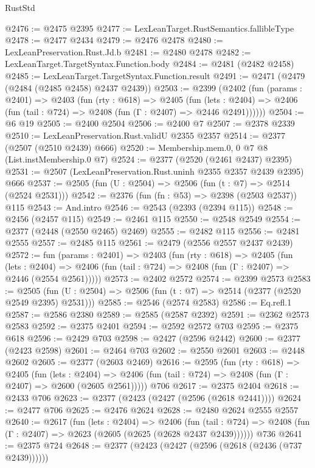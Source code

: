\begin{lexlean}{RustStd}
\begin{coremodule}
@2476 := @2475 @2395
@2477 := LexLeanTarget.RustSemantics.fallibleType
@2478 := @2477 @2434
@2479 := @2476 @2478
@2480 := LexLeanPreservation.Rust.Jd.b
@2481 := @2480 @2478
@2482 := LexLeanTarget.TargetSyntax.Function.body
@2484 := @2481 (@2482 @2458)
@2485 := LexLeanTarget.TargetSyntax.Function.result
@2491 := @2471 (@2479 (@2484 (@2485 @2458) @2437 @2439))
@2503 := @2399
    (@2402
      (fun (params : @2401) =>
      @2403
        (fun (rty : @618) =>
        @2405
          (fun (lets : @2404) =>
          @2406 (fun (tail : @724) => @2408 (fun (Γ : @2407) => @2446 @2491))))))
@2504 := @6 @19
@2505 := @2400 @2504
@2506 := @2400 @7
@2507 := @2378 @2339
@2510 := LexLeanPreservation.Rust.validU @2355 @2357
@2514 := @2377 (@2507 (@2510 @2439) @666)
@2520 := Membership.mem.{0, 0} @7 @8 (List.instMembership.{0} @7)
@2524 := @2377 (@2520 (@2461 @2437) @2395)
@2531 := @2507 (LexLeanPreservation.Rust.uninh @2355 @2357 @2439 @2395) @666
@2537 := @2505 (fun (U : @2504) => @2506 (fun (t : @7) => @2514 (@2524 @2531)))
@2542 := @2376 (fun (fn : @53) => @2398 (@2503 @2537)) @115
@2543 := And.intro
@2546 := @2543 (@2393 (@2394 @115))
@2548 := @2456 (@2457 @115)
@2549 := @2461 @115
@2550 := @2548 @2549
@2554 := @2377 (@2448 (@2550 @2465) @2469)
@2555 := @2482 @115
@2556 := @2481 @2555
@2557 := @2485 @115
@2561 := @2479 (@2556 @2557 @2437 @2439)
@2572 := fun (params : @2401) =>
  @2403
    (fun (rty : @618) =>
    @2405
      (fun (lets : @2404) =>
      @2406 (fun (tail : @724) => @2408 (fun (Γ : @2407) => @2446 (@2554 @2561)))))
@2573 := @2402 @2572
@2574 := @2399 @2573
@2583 := @2505 (fun (U : @2504) => @2506 (fun (t : @7) => @2514 (@2377 (@2520 @2549 @2395) @2531)))
@2585 := @2546 (@2574 @2583)
@2586 := Eq.refl.{1}
@2587 := @2586 @2380
@2589 := @2585 (@2587 @2392)
@2591 := @2362 @2573 @2583
@2592 := @2375 @2401
@2594 := @2592 @2572 @703
@2595 := @2375 @618
@2596 := @2429 @703
@2598 := @2427 (@2596 @2442)
@2600 := @2377 (@2423 @2598)
@2601 := @2464 @703
@2602 := @2550 @2601
@2603 := @2448 @2602
@2605 := @2377 (@2603 @2469)
@2616 := @2595
    (fun (rty : @618) =>
    @2405
      (fun (lets : @2404) =>
      @2406 (fun (tail : @724) => @2408 (fun (Γ : @2407) => @2600 (@2605 @2561)))))
    @706
@2617 := @2375 @2404
@2618 := @2433 @706
@2623 := @2377 (@2423 (@2427 (@2596 (@2618 @2441))))
@2624 := @2477 @706
@2625 := @2476 @2624
@2628 := @2480 @2624 @2555 @2557
@2640 := @2617
    (fun (lets : @2404) =>
    @2406
      (fun (tail : @724) => @2408 (fun (Γ : @2407) => @2623 (@2605 (@2625 (@2628 @2437 @2439))))))
    @736
@2641 := @2375 @724
@2648 := @2377 (@2423 (@2427 (@2596 (@2618 (@2436 (@737 @2439))))))

\end{coremodule}
\end{lexlean}
